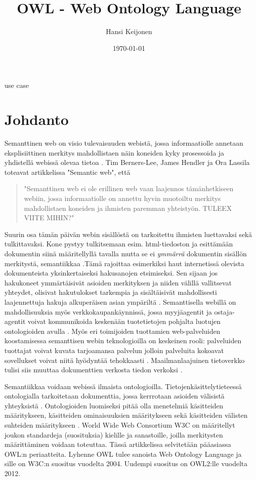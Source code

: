 \documentclass[finnish]{tktltiki2}
\title{OWL - Web Ontology Language}
\author{Hansi Keijonen}
\date{\today}
\theoremstyle{definition}
\theoremstyle{remark}
\begin{document}

\maketitle        %
\makeabstract     %

\tableofcontents  %
\newpage          %


use case

\section{Johdanto}
Semanttinen web on visio tulevaisuuden webistä, jossa informaatiolle annetaan eksplisiittinen
merkitys mahdollistaen näin koneiden kyky prosessoida ja yhdistellä webissä olevaa tietoa \cite{MH04}.  
Tim Berners-Lee, James Hendler ja Ora Lassila toteavat
artikkelissa "Semantic web", että  
\begin{quote}
"Semanttinen web ei ole erillinen web vaan
laajennos tämänhetkiseen webiin, jossa informaatiolle on annettu hyvin muotoiltu
merkitys mahdollistaen koneiden ja ihmisten paremman yhteistyön. TULEEX VIITE MIHIN?"
\end{quote}
Suurin osa tämän päivän webin sisällöstä on tarkoitettu ihmisten luettavaksi sekä tulkittavaksi.
Kone pystyy tulkitsemaan esim. html-tiedoston ja esittämään
dokumentin siinä määritellyllä tavalla mutta se ei
\textit{ymmärrä} dokumentin sisällön merkitystä, semantiikkaa \cite{BHL01}.Tämä 
rajoittaa esimerkiksi haut internetissä olevista dokumenteista yksinkertaiseksi hakusanojen
etsimiseksi. Sen sijaan jos hakukoneet ymmärtäisivät asioiden merkityksen ja
niiden välillä vallitsevat yhteydet, olisivat hakutulokset tarkempia
ja sisältäisivät mahdollisesti laajennettuja hakuja alkuperäisen asian ympäriltä
\cite{SHIQ}. Semanttisella webillä on mahdollisuuksia myös verkkokaupankäynnissä, jossa 
myyjäagentit ja ostaja-agentit voivat kommunikoida keskenään tuotetietojen pohjalta luotujen 
ontologioiden avulla \cite{SHIQ}. Myös eri toimijoiden tuottamien web-palveluiden koostamisessa semanttisen 
webin teknologioilla on keskeinen rooli: palveluiden tuottajat voivat kuvata tarjoamansa
palvelun jolloin palveluita kokoavat sovellukset voivat niitä hyödyntää tehokkaasti \cite{SHIQ}. 
Maailmanlaajuinen tietoverkko tulisi siis muuttaa dokumenttien verkosta 
tiedon verkoksi \cite{BHL01}. 

Semantiikkaa voidaan webissä ilmaista ontologioilla. Tietojenkäsittelytieteessä
ontologialla tarkoitetaan dokumenttia, jossa kerrrotaan asioiden välisistä
yhteyksistä \cite{BHL01}.
Ontologioiden luomiseksi pitää olla menetelmiä käsitteiden määritykseen, käsitteiden
ominaisuuksien määritykseen sekä käsitteiden välisten suhteiden määritykseen
\cite{BHL01}. World Wide Web Consortium W3C on määritellyt 
joukon standardeja (suosituksia) kielille ja sanastoille, joilla merkitysten määrittäminen voidaan toteuttaa.
Tässä artikkelissa selvitetään pääasiassa OWL:n periaatteita. Lyhenne OWL tulee sanoista Web Ontology Language ja sille on
W3C:n suositus vuodelta 2004. Uudempi suositus on OWL2:lle vuodelta 2012. 
\end{document}
